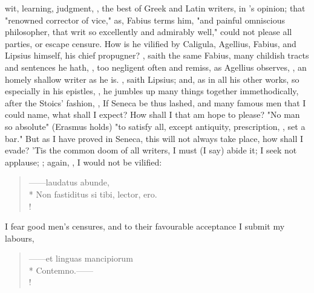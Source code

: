 wit, learning, judgment, , the
best of Greek and Latin writers, in 's opinion; that
"renowned corrector of vice," as, Fabius terms him, "and
painful omniscious philosopher, that writ so excellently and admirably well,"
could not please all parties, or escape censure. How is he vilified by
Caligula, Agellius, Fabius, and Lipsius himself, his
chief propugner? , saith the same Fabius, many
childish tracts and sentences he hath, , too negligent
often and remiss, as Agellius observes, , an homely shallow writer as
he is. , saith
Lipsius; and, as in all his other works, so especially in
his epistles, , he jumbles up many things
together immethodically, after the Stoics' fashion, , \etc{} If Seneca be thus lashed, and many famous men that I could
name, what shall I expect? How shall I that am 
hope to please? "No man so absolute" (Erasmus holds) "to
satisfy all, except antiquity, prescription, \etc{}, set a bar." But as I have
proved in Seneca, this will not always take place, how shall I evade? 'Tis the
common doom of all writers, I must (I say) abide it; I seek not applause;
; again,
, I would not be vilified:

\begin{latin}
\begin{verse}%
------laudatus abunde,\\*
Non fastiditus si tibi, lector, ero.\\!
\end{verse}%
\end{latin}

I fear good men's censures, and to their favourable acceptance I submit my labours,

\begin{latin}
\begin{verse}%
------et linguas mancipiorum\\*
Contemno.------\\!
\end{verse}%
\end{latin}

